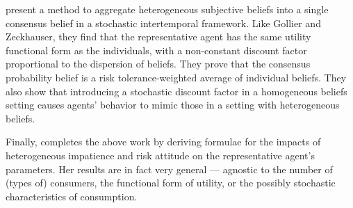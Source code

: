 \documentclass{hw}
\begin{document}
\cite{jouini07} present a method to aggregate heterogeneous subjective beliefs into a single consensus belief in a stochastic intertemporal framework. Like Gollier and Zeckhauser, they find that the representative agent has the same utility functional form as the individuals, with a non-constant discount factor proportional to the dispersion of beliefs. They prove that the consensus probability belief is a risk tolerance-weighted average of individual beliefs. They also show that introducing a stochastic discount factor in a homogeneous beliefs setting causes agents' behavior to mimic those in a setting with heterogeneous beliefs.

Finally, \cite{hara09} completes the above work by deriving formulae for the impacts of heterogeneous impatience and risk attitude on the representative agent's parameters. Her results are in fact very general --- agnostic to the number of (types of) consumers, the functional form of utility, or the possibly stochastic characteristics of consumption.



\end{document}
